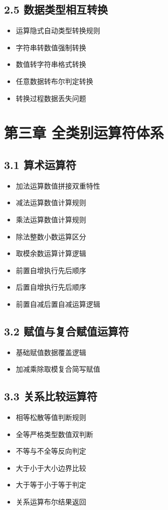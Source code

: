 \subsection{2.5 数据类型相互转换}
\begin{itemize}
\item 运算隐式自动类型转换规则
\item 字符串转数值强制转换
\item 数值转字符串格式转换
\item 任意数据转布尔判定转换
\item 转换过程数据丢失问题
\end{itemize}

\section{第三章 全类别运算符体系}
\subsection{3.1 算术运算符}
\begin{itemize}
\item 加法运算数值拼接双重特性
\item 减法运算数值计算规则
\item 乘法运算数值计算规则
\item 除法整数小数运算区分
\item 取模余数运算计算逻辑
\item 前置自增执行先后顺序
\item 后置自增执行先后顺序
\item 前置自减后置自减运算逻辑
\end{itemize}

\subsection{3.2 赋值与复合赋值运算符}
\begin{itemize}
\item 基础赋值数据覆盖逻辑
\item 加减乘除取模复合简写赋值
\end{itemize}

\subsection{3.3 关系比较运算符}
\begin{itemize}
\item 相等松散等值判断规则
\item 全等严格类型数值双判断
\item 不等与不全等反向判定
\item 大于小于大小边界比较
\item 大于等于小于等于判定
\item 关系运算布尔结果返回
\end{itemize}

